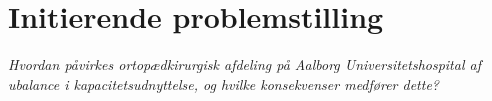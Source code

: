 \section{Initierende problemstilling}
\textit{Hvordan påvirkes ortopædkirurgisk afdeling på Aalborg Universitetshospital af ubalance i kapacitetsudnyttelse, og hvilke konsekvenser medfører dette?}




%
%
%
%
%
%
